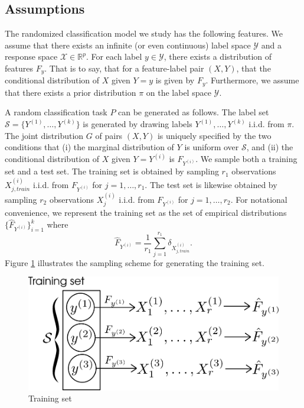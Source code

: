 \documentclass[12pt]{article}
\begin{document}
\subsection{Assumptions}

The randomized classification model we study has the following
features.  We assume that there exists an infinite (or even
continuous) label space $\mathcal{Y}$ and a response space
$\mathcal{X} \in \mathbb{R}^p$.  For each label $y \in \mathcal{Y}$,
there exists a distribution of features $F_y$.  That is to say, that
for a feature-label pair $(X, Y)$, that the conditional distribution
of $X$ given $Y = y$ is given by $F_y$.  Furthermore, we assume that
there exists a prior distribution $\pi$ on the label space $\mathcal{Y}$.

A random classification task $P$ can be generated as follows.  The
label set $\mathcal{S} = \{Y^{(1)},\hdots, Y^{(k)}\}$ is generated by
drawing labels $Y^{(1)},\hdots, Y^{(k)}$ i.i.d. from $\pi$.  The joint
distribution $G$ of pairs $(X, Y)$ is uniquely specified by the two
conditions that (i) the marginal distribution of $Y$ is uniform over
$\mathcal{S}$, and (ii) the conditional distribution of $X$ given
$Y=Y^{(i)}$ is $F_{Y^{(i)}}$.  We sample both a training set and a
test set.  The training set is obtained by sampling $r_1$ observations
$X_{j, train}^{(i)}$ i.i.d. from $F_{Y^{(i)}}$ for $j = 1,\hdots,
r_1$.  The test set is likewise obtained by sampling $r_2$
observations $X_j^{(i)}$ i.i.d. from $F_{Y^{(i)}}$ for $j = 1,\hdots,
r_2$.  For notational convenience, we represent the training set as
the set of empirical distributions $\{\hat{F}_{Y^{(i)}}\}_{i=1}^k$
where
\[
\hat{F}_{Y^{(i)}} = \frac{1}{r_1} \sum_{j=1}^{r_1} \delta_{X^{(i)}_{j, train}}.
\]
Figure \ref{fig:training_set} illustrates the sampling scheme for
generating the training set.

\begin{figure}[h]
\centering
\includegraphics[scale = 0.4]{training_set.png}
\caption{Training set}\label{fig:training_set}
\end{figure}
\end{document}
